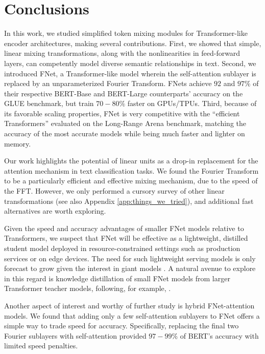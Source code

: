 \section{Conclusions}
\label{sec:conclusion}

In this work, we studied simplified token mixing modules for Transformer-like encoder architectures, making several contributions. First, we showed that simple, linear mixing transformations, along with the nonlinearities in feed-forward layers, can competently model diverse semantic relationships in text. Second, we introduced FNet, a Transformer-like model wherein the self-attention sublayer is replaced by an unparameterized Fourier Transform. FNets achieve $92$ and $97\%$ of their respective BERT-Base and BERT-Large counterparts' accuracy on the GLUE benchmark, but train $70-80\%$ faster on GPUs/TPUs. Third, because of its favorable scaling properties, FNet is very competitive with the ``efficient Transformers'' evaluated on the Long-Range Arena benchmark, matching the accuracy of the most accurate models while being much faster and lighter on memory. 

Our work highlights the potential of linear units as a drop-in replacement for the attention mechanism in text classification tasks. We found the Fourier Transform to be a particularly efficient and effective mixing mechanism, due to the speed of the FFT. However, we only performed a cursory survey of other linear transformations (see also Appendix \ref{app:things_we_tried}), and additional fast alternatives are worth exploring.

Given the speed and accuracy advantages of smaller FNet models relative to Transformers, we suspect that FNet will be effective as a lightweight, distilled student model deployed in resource-constrained settings such as production services or on edge devices. The need for such lightweight serving models is only forecast to grow given the interest in giant models \citep{raffel2019exploring, brown2020language, lepikhin2020gshard}. A natural avenue to explore in this regard is knowledge distillation of small FNet models from larger Transformer teacher models, following, for example, \citet{sanh2019distilbert, jiao2019tinybert, turc2019well}.

Another aspect of interest and worthy of further study is hybrid FNet-attention models. We found that adding only a few self-attention sublayers to FNet offers a simple way to trade speed for accuracy. Specifically, replacing the final two Fourier sublayers with self-attention provided $97-99\%$ of BERT's accuracy with limited speed penalties.

